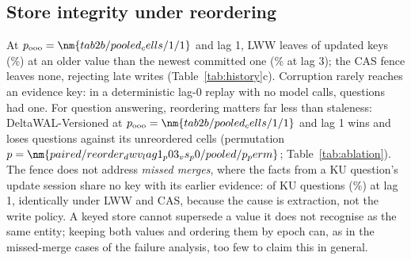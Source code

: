 \subsection{Store integrity under reordering}
\label{sec:hist-reorder}

At $p_\text{ooo}=\nm{tab2b/pooled_cells/1/1}$ and lag 1, LWW leaves  of  updated keys (\%) at an older value than the newest committed one (\% at lag 3); the CAS fence leaves none, rejecting  late writes (Table~\ref{tab:history}c). Corruption rarely reaches an evidence key: in a deterministic lag-0 replay with no model calls,  questions had one. For question answering, reordering matters far less than staleness: DeltaWAL-Versioned at $p_\text{ooo}=\nm{tab2b/pooled_cells/1/1}$ and lag 1 wins  and loses  questions against its unreordered cells (permutation $p=\nm{paired/reorder_dwv_lag1_p03_vs_p0/pooled/p_perm}$; Table~\ref{tab:ablation}). The fence does not address \emph{missed merges}, where the facts from a KU question's update session share no key with its earlier evidence:  of  KU questions (\%) at lag 1, identically under LWW and CAS, because the cause is extraction, not the write policy. A keyed store cannot supersede a value it does not recognise as the same entity; keeping both values and ordering them by epoch can, as in the  missed-merge cases of the failure analysis, too few to claim this in general.
